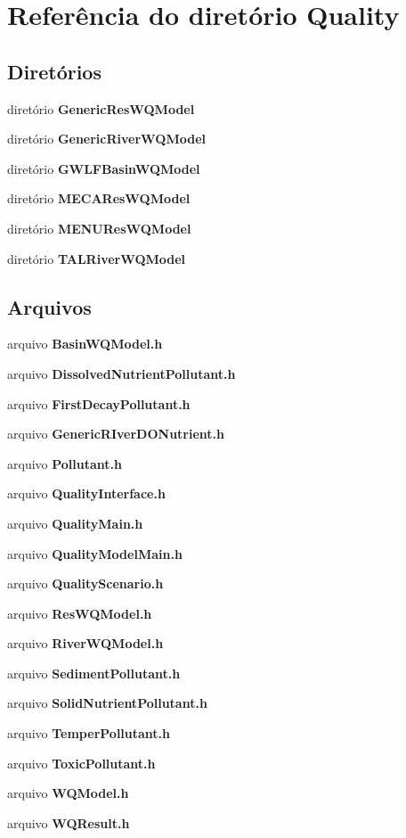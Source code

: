 \section{Referência do diretório Quality}
\label{dir_7526f2b168c1d6e58becea5c4a52c6ab}
\subsection*{Diretórios}
\begin{DoxyCompactItemize}
\item 
diretório {\bf Generic\+Res\+W\+Q\+Model}
\item 
diretório {\bf Generic\+River\+W\+Q\+Model}
\item 
diretório {\bf G\+W\+L\+F\+Basin\+W\+Q\+Model}
\item 
diretório {\bf M\+E\+C\+A\+Res\+W\+Q\+Model}
\item 
diretório {\bf M\+E\+N\+U\+Res\+W\+Q\+Model}
\item 
diretório {\bf T\+A\+L\+River\+W\+Q\+Model}
\end{DoxyCompactItemize}
\subsection*{Arquivos}
\begin{DoxyCompactItemize}
\item 
arquivo {\bf Basin\+W\+Q\+Model.\+h}
\item 
arquivo {\bf Dissolved\+Nutrient\+Pollutant.\+h}
\item 
arquivo {\bf First\+Decay\+Pollutant.\+h}
\item 
arquivo {\bf Generic\+R\+Iver\+D\+O\+Nutrient.\+h}
\item 
arquivo {\bf Pollutant.\+h}
\item 
arquivo {\bf Quality\+Interface.\+h}
\item 
arquivo {\bf Quality\+Main.\+h}
\item 
arquivo {\bf Quality\+Model\+Main.\+h}
\item 
arquivo {\bf Quality\+Scenario.\+h}
\item 
arquivo {\bf Res\+W\+Q\+Model.\+h}
\item 
arquivo {\bf River\+W\+Q\+Model.\+h}
\item 
arquivo {\bf Sediment\+Pollutant.\+h}
\item 
arquivo {\bf Solid\+Nutrient\+Pollutant.\+h}
\item 
arquivo {\bf Temper\+Pollutant.\+h}
\item 
arquivo {\bf Toxic\+Pollutant.\+h}
\item 
arquivo {\bf W\+Q\+Model.\+h}
\item 
arquivo {\bf W\+Q\+Result.\+h}
\end{DoxyCompactItemize}

